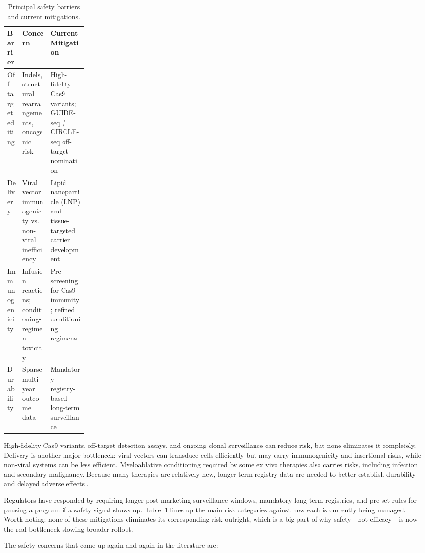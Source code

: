 \documentclass[11pt,a4paper]{article}
\newcommand{\tablefont}{\small}
\begin{document}
\begin{table}[!htbp]
\centering
\tablefont
\caption{Principal safety barriers and current mitigations.}
\label{tab:safety-barriers}
\begin{tabularx}{\linewidth}{|>{\raggedright\arraybackslash}p{0.19\linewidth}|>{\raggedright\arraybackslash}X|>{\raggedright\arraybackslash}X|}
\hline
\textbf{Barrier} & \textbf{Concern} & \textbf{Current Mitigation} \\
\hline
Off-target editing & Indels, structural rearrangements, oncogenic risk & High-fidelity Cas9 variants; GUIDE-seq / CIRCLE-seq off-target nomination \\
\hline
Delivery & Viral vector immunogenicity vs. non-viral inefficiency & Lipid nanoparticle (LNP) and tissue-targeted carrier development \\
\hline
Immunogenicity & Infusion reactions; conditioning-regimen toxicity & Pre-screening for Cas9 immunity; refined conditioning regimens \\
\hline
Durability & Sparse multi-year outcome data & Mandatory registry-based long-term surveillance \\
\hline
\end{tabularx}
\end{table}

High-fidelity Cas9 variants, off-target detection assays, and ongoing clonal surveillance can reduce risk, but none eliminates it completely. Delivery is another major bottleneck: viral vectors can transduce cells efficiently but may carry immunogenicity and insertional risks, while non-viral systems can be less efficient. Myeloablative conditioning required by some ex vivo therapies also carries risks, including infection and secondary malignancy. Because many therapies are relatively new, longer-term registry data are needed to better establish durability and delayed adverse effects \cite{kalter2025,aljabali2024}.

Regulators have responded by requiring longer post-marketing surveillance windows, mandatory long-term registries, and pre-set rules for pausing a program if a safety signal shows up. Table~\ref{tab:safety-barriers} lines up the main risk categories against how each is currently being managed. Worth noting: none of these mitigations eliminates its corresponding risk outright, which is a big part of why safety---not efficacy---is now the real bottleneck slowing broader rollout.


The safety concerns that come up again and again in the literature are:
\end{document}
